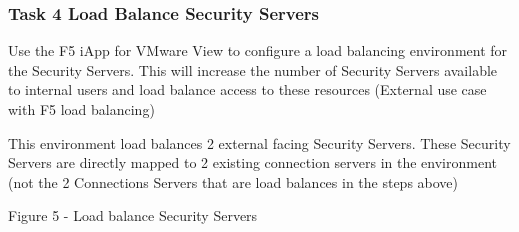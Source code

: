 \documentclass[letterpaper,10pt,english]{sphinxmanual}
\begin{document}
\subsubsection{Task 4 \textendash{} Load Balance Security Servers}
\label{\detokenize{class2/module1/lab1:task-4-load-balance-security-servers}}
Use the F5 iApp for VMware View to configure a load balancing
environment for the Security Servers. This will increase the number of
Security Servers available to internal users and load balance access to
these resources (External use case with F5 load balancing)

This environment load balances 2 external facing Security Servers. These
Security Servers are directly mapped to 2 existing connection servers in
the environment (not the 2 Connections Servers that are load balances in
the steps above)


Figure 5 - Load balance Security Servers
\end{document}
